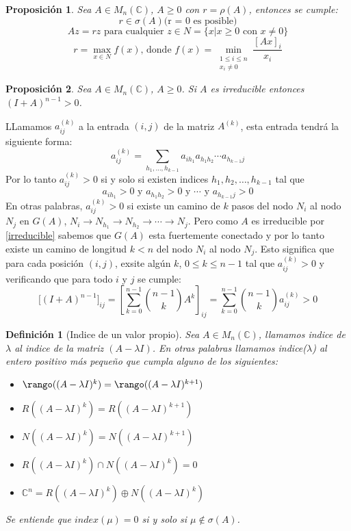 \documentclass[size=a4, parskip=half, titlepage=false, toc=flat, toc=bib, 12pt]{scrartcl}
\makeatletter
\renewenvironment{proof}[1][\proofname] {\par\pushQED{\qed}\normalfont\topsep6\p@\@plus6\p@\relax\trivlist\item[\hskip\labelsep\itshape\tgpaella#1\@addpunct{.}]\ignorespaces}{\popQED\endtrivlist\@endpefalse}
\theoremstyle{theorem-style}
\newtheorem{nprop}{Proposición}[section]
\theoremstyle{definition-style}
\newtheorem{ndef}{Definición}[section]
\theoremstyle{remark-style}
\theoremstyle{example-style}
\theoremstyle{definition-style}
\theoremstyle{remark-style}
\makeatother
\begin{document}
\begin{nprop}
Sea $A \in M_n(\mathbb{C})$, $A \geq 0$ con $r = \rho(A)$, entonces se cumple:
\begin{equation} r \in \sigma(A) \textrm{(r = 0 es posible)} \end{equation}
\begin{equation} \label{vectorpropio} Az = rz \textrm{ para cualquier } z \in N = \{x | x \geq 0 \textrm{ con } x \neq 0 \} \end{equation}
\begin{equation}r = \max_{x \in N} f(x) \textrm{, donde } f(x)= \min_{\substack{1 \leq i \leq n \\ x_i \neq 0}} \frac{[Ax]_i}{x_i} \end{equation}
\end{nprop}

\begin{nprop}
\label{positiva}
Sea $A \in M_n(\mathbb{C})$, $A \geq 0$. Si $A$ es irreducible entonces $(I+A)^{n-1} > 0$.
\end{nprop}
\begin{proof}
LLamamos $a_{ij}^{(k)}$ a la entrada $(i,j)$ de la matriz $A^{(k)}$, esta entrada tendrá la siguiente forma:
$$ a_{ij}^{(k)} = \sum_{h_1,\dots, h_{k-1}} a_{ih_1}a_{h_1h_2} \cdots a_{h_{k-1}j}$$
Por lo tanto $a_{ij}^{(k)} >0 $ si y solo si existen indices $h_1,h_2, \dots , h_{k-1}$ tal que
$$a_{ih_1} > 0 \textrm{ y } a_{h_1h_2}  > 0\textrm{ y } \cdots \textrm{ y } a_{h_{k-1}j}>0$$
En otras palabras, $a_{ij}^{(k)} > 0$ si existe un camino de $k$ pasos del nodo $N_i$ al nodo $N_j$ en $G(A)$,  $N_i \rightarrow N_{h_1} \rightarrow N_{h_2} \rightarrow \cdots \rightarrow N_j$. Pero como $A$ es irreducible por \ref{irreducible} sabemos que $G(A)$ esta fuertemente conectado y por lo tanto existe un camino de longitud $k < n$ del nodo $N_i$ al nodo $N_j$. Esto significa que para cada posición $(i,j)$, exsite algún $k$, $0 \leq k \leq n - 1$ tal que
$a_{ij}^{(k)} > 0$ y  verificando que para todo $i$ y $j$ se cumple:
$$\big[(I+A)^{n-1}\big]_{ij} = \left[ \sum_{k=0}^{n-1} {{n-1}\choose{k}} A^k \right]_{ij} = \sum_{k=0}^{n-1}  {{n-1}\choose{k}} a_{ij}^{(k)} > 0 $$
\end{proof}

\begin{ndef}[Indice de un valor propio]
Sea $A \in M_n(\mathbb{C})$, llamamos indice de $\lambda$ al indice de la matriz $(A-\lambda I)$. En otras palabras llamamos indice($\lambda$) al entero positivo más pequeño que cumpla alguno de los siguientes:
\begin{itemize}
\item $\rango ((A - \lambda I)^k) = \rango ((A - \lambda I)^{k+1})$
\item $R((A - \lambda I)^k) = R ((A - \lambda I)^{k+1})$
\item $N((A - \lambda I)^k) = N ((A - \lambda I)^{k+1})$
\item $R((A - \lambda I)^k) \cap N((A -\lambda I)^k) =0$
\item $ \mathbb{C}^n = R((A - \lambda I)^k) \oplus N((A- \lambda I)^k)$
\end{itemize}
Se entiende que $index(\mu) = 0$ si y solo si $\mu \notin \sigma(A)$.
\end{ndef}
\end{document}
